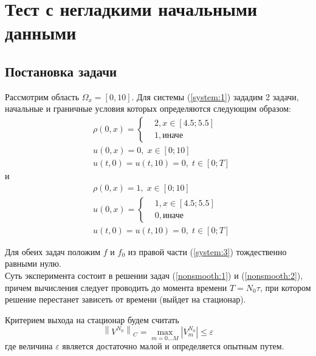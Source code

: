 \section{Тест с негладкими начальными данными}

\subsection{Постановка задачи}
Рассмотрим область $\Omega_x = [0,10]$. Для системы (\ref{system:1}) зададим 2 задачи, начальные и граничные условия которых определяются следующим образом:
\begin{equation}
\label{nonsmooth:1}
\begin{aligned}
  & \rho(0, x) = 
    \left\{
      \begin{aligned}
        & 2, x \in [4.5; 5.5] \\
        & 1, \text{иначе}
      \end{aligned}
    \right. \\
  & u(0, x) = 0, \; x \in [0; 10] \\
  & u(t, 0) = u(t, 10) = 0, \; t \in [0; T] 
\end{aligned}
\end{equation}
и
\begin{equation}
\label{nonsmooth:2}
\begin{aligned}
  & \rho(0, x)= 1, \; x \in [0; 10] \\
  & u(0, x) = 
    \left\{
      \begin{aligned}
        & 1, x \in [4.5; 5.5] \\
        & 0, \text{иначе}
      \end{aligned}
    \right. \\
  & u(t, 0) = u(t, 10) = 0, \; t \in [0; T] 
\end{aligned}
\end{equation}

Для обеих задач положим $f$ и $f_0$ из правой части (\ref{system:3}) тождественно равными нулю. \\

Суть эксперимента состоит в решении задач (\ref{nonsmooth:1}) и (\ref{nonsmooth:2}), причем вычисления следует проводить до момента времени $T = N_0 \tau$, при котором решение перестанет зависеть от времени (выйдет на стационар). 

Критерием выхода на стационар будем считать
$$
  \left\| V^{N_{0}} \right\|_C =
  \max_{m = 0 \dots M} \left| V_{m}^{N_{0}} \right| 
  \leq \varepsilon
$$
где величина $\varepsilon$ является достаточно малой и определяется опытным путем. \\

